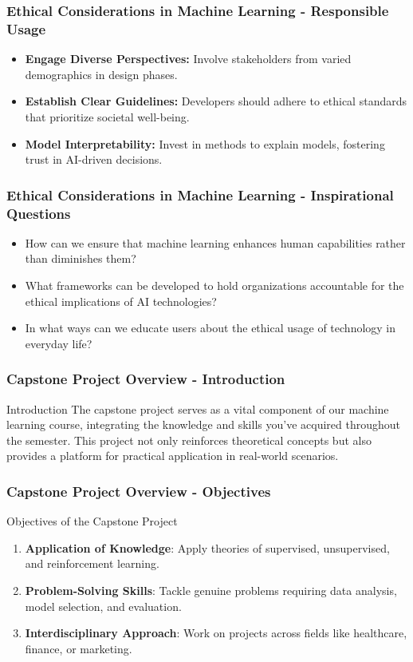 \documentclass[aspectratio=169]{beamer}
\begin{document}
\begin{frame}[fragile]
    \frametitle{Ethical Considerations in Machine Learning - Responsible Usage}
    \begin{itemize}
        \item \textbf{Engage Diverse Perspectives:} Involve stakeholders from varied demographics in design phases.
        \item \textbf{Establish Clear Guidelines:} Developers should adhere to ethical standards that prioritize societal well-being.
        \item \textbf{Model Interpretability:} Invest in methods to explain models, fostering trust in AI-driven decisions.
    \end{itemize}
\end{frame}

\begin{frame}[fragile]
    \frametitle{Ethical Considerations in Machine Learning - Inspirational Questions}
    \begin{itemize}
        \item How can we ensure that machine learning enhances human capabilities rather than diminishes them?
        \item What frameworks can be developed to hold organizations accountable for the ethical implications of AI technologies?
        \item In what ways can we educate users about the ethical usage of technology in everyday life?
    \end{itemize}
\end{frame}

\begin{frame}[fragile]
    \frametitle{Capstone Project Overview - Introduction}
    \begin{block}{Introduction}
        The capstone project serves as a vital component of our machine learning course, integrating the knowledge and skills you've acquired throughout the semester. This project not only reinforces theoretical concepts but also provides a platform for practical application in real-world scenarios.
    \end{block}
\end{frame}

\begin{frame}[fragile]
    \frametitle{Capstone Project Overview - Objectives}
    \begin{block}{Objectives of the Capstone Project}
        \begin{enumerate}
            \item \textbf{Application of Knowledge}: Apply theories of supervised, unsupervised, and reinforcement learning.
            \item \textbf{Problem-Solving Skills}: Tackle genuine problems requiring data analysis, model selection, and evaluation.
            \item \textbf{Interdisciplinary Approach}: Work on projects across fields like healthcare, finance, or marketing.
        \end{enumerate}
    \end{block}
\end{frame}
\end{document}
